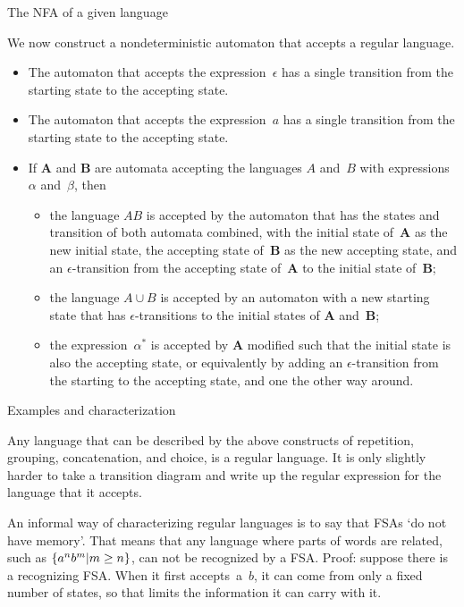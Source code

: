  {The NFA of a given language}

We now construct a nondeterministic automaton that accepts a regular language.
\begin{itemize}
\item The automaton that accepts the expression~$\epsilon$ has a single
  transition from the starting state to the accepting state.
  \\
\item The automaton that accepts the expression~$a$ has a single
  transition from the starting state to the accepting state.
  \\
\item If {\bf A} and {\bf B} are automata accepting the languages $A$
  and~$B$ with expressions $\alpha$ and~$\beta$, then
\begin{itemize}
\item the language $AB$ is accepted by the automaton that
  has the states and transition of both automata combined, with the
  initial state of~{\bf A} as the new initial state, the accepting
  state of~{\bf B} as the new accepting state, and an
  $\epsilon$-transition from the accepting state of~{\bf A} to the
  initial state of~{\bf B};
  \\
\item the language $A\cup B$ is accepted by an automaton with a new
  starting state that has $\epsilon$-transitions to the initial states
  of {\bf A} and~{\bf B};
  \\
\item the expression~$\alpha^*$ is accepted by {\bf A} modified such
  that the initial state is also the accepting state, or equivalently
  by adding an $\epsilon$-transition from the starting to the
  accepting state, and one the other way around.
\end{itemize}
\end{itemize}

 {Examples and characterization}
\label{pump:regular}

Any language that can be described by the above constructs of
repetition, grouping, concatenation, and choice, is a regular
language. It is only slightly harder to take a transition diagram and
write up the regular expression for the language that it accepts.

An informal way of characterizing regular languages is to say that
FSAs `do not have memory'. That means that any language where parts of
words are related, such as $\{a^nb^m|\allowbreak m\geq\nobreak n\}$,
can not be recognized by a FSA. Proof: suppose there is a recognizing
FSA. When it first accepts~a~$b$, it can come from only a fixed number
of states, so that limits the information it can carry with it.

